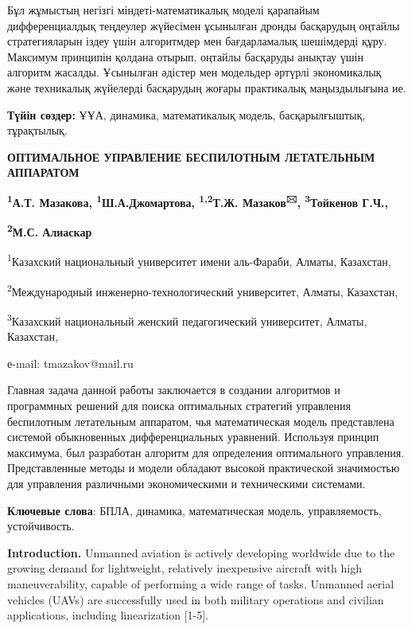 Бұл жұмыстың негізгі міндеті-математикалық моделі қарапайым
дифференциалдық теңдеулер жүйесімен ұсынылған дронды басқарудың оңтайлы
стратегияларын іздеу үшін алгоритмдер мен бағдарламалық шешімдерді құру.
Максимум принципін қолдана отырып, оңтайлы басқаруды анықтау үшін
алгоритм жасалды. Ұсынылған әдістер мен модельдер әртүрлі экономикалық
және техникалық жүйелерді басқарудың жоғары практикалық маңыздылығына
ие.

{\bfseries Түйін сөздер:} ҰҰА, динамика, математикалық модель,
басқарылғыштық, тұрақтылық.
\begin{center}

{\bfseries ОПТИМАЛЬНОЕ УПРАВЛЕНИЕ БЕСПИЛОТНЫМ ЛЕТАТЕЛЬНЫМ АППАРАТОМ}

{\bfseries \textsuperscript{1}А.Т. Мазакова,
\textsuperscript{1}Ш.А.Джомартова, \textsuperscript{1,2}Т.Ж.
Мазаков\textsuperscript{🖂}, \textsuperscript{3}Тойкенов Г.Ч.,}

{\bfseries \textsuperscript{2}М.С. Алиаскар}

\textsuperscript{1}Казахский национальный университет имени аль-Фараби,
Алматы, Казахстан,

\textsuperscript{2}Международный инженерно-технологический университет,
Алматы, Казахстан,

\textsuperscript{3}Казахский национальный женский педагогический
университет, Алматы, Казахстан,

е-mail: tmazakov@mail.ru
\end{center}

Главная задача данной работы заключается в создании алгоритмов и
программных решений для поиска оптимальных стратегий управления
беспилотным летательным аппаратом, чья математическая модель
представлена системой обыкновенных дифференциальных уравнений. Используя
принцип максимума, был разработан алгоритм для определения оптимального
управления. Представленные методы и модели обладают высокой практической
значимостью для управления различными экономическими и техническими
системами.

{\bfseries Ключевые слова}: БПЛА, динамика, математическая модель,
управляемость, устойчивость.

{\bfseries Introduction.} Unmanned aviation is actively developing
worldwide due to the growing demand for lightweight, relatively
inexpensive aircraft with high maneuverability, capable of performing a
wide range of tasks. Unmanned aerial vehicles (UAVs) are successfully
used in both military operations and civilian applications, including
linearization {[}1-5{]}.

